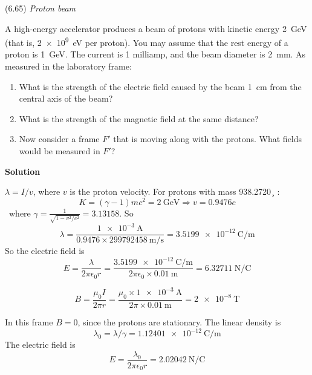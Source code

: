 \documentclass{article}
\begin{document}
\begin{homeworkProblem}
	(6.65) \textit{Proton beam}

	A high-energy accelerator produces a beam of protons with kinetic energy \SI{2}{\GeV} (that is, \SI{2e9}{\electronvolt} per proton). You may assume that the rest energy of a proton is \SI{1}{\giga\electronvolt}. The current is 1 milliamp, and the beam diameter is \SI{2}{\mm}. As measured in the laboratory frame:
	\begin{enumerate}[label = (\alph*)]
		\item What is the strength of the electric field caused by the beam \SI{1}{\cm} from the central axis of the beam?
		\item What is the strength of the magnetic field at the same distance?
		\item Now consider a frame $F'$ that is moving along with the protons. What fields would be measured in $F'$?
	\end{enumerate}

	\textbf{Solution}
	\begin{enumerate}[label = (\alph*)]
		\begin{item}
			$\lambda=I/v$, where $v$ is the proton velocity. For protons with mass \SI{938.2720}{\MeV\per\square\c}:
			\[
				K=\left(\gamma-1\right)mc^2=\SI{2}{\giga\electronvolt}\Longrightarrow v=0.9476c
			\]
			where $\gamma=\frac{1}{\sqrt{1-v^2/c^2}}=3.13158$. So
			\[
				\lambda=\frac{\SI{1e-3}{\ampere}}{0.9476\times\SI{299792458}{\m\per\s}}=\SI{3.5199e-12}{\coulomb\per\m}
			\]
			So the electric field is
			\[
				E=\frac{\lambda}{2\pi\epsilon_0r}=\frac{\SI{3.5199e-12}{\coulomb\per\m}}{2\pi\epsilon_0\times\SI{0.01}{\m}}=\SI{6.32711}{\newton\per\coulomb}
			\]
		\end{item}
		\begin{item}
			\[
				B=\frac{\mu_0I}{2\pi r}=\frac{\mu_0\times\SI{1e-3}{\ampere}}{2\pi\times\SI{0.01}{\m}}=\SI{2e-8}{\tesla}
			\]
		\end{item}
		\begin{item}
			In this frame $B=0$, since the protons are stationary. The linear density is
			\[
				\lambda_0=\lambda/\gamma=\SI{1.12401e-12}{\coulomb\per\m}
			\]
			The electric field is
			\[
				E=\frac{\lambda_0}{2\pi\epsilon_0r}=\SI{2.02042}{\newton\per\coulomb}
			\]
		\end{item}
	\end{enumerate}
\end{homeworkProblem}

\end{document}
